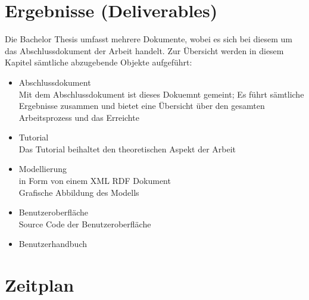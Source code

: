 \section{Ergebnisse (Deliverables)}
\label{sec:admin_ergebniss}
Die Bachelor Thesis umfasst mehrere Dokumente, wobei es sich bei diesem um das Abschlussdokument der Arbeit handelt. Zur Übersicht werden in diesem Kapitel sämtliche abzugebende Objekte aufgeführt:
\begin{itemize}
	\item Abschlussdokument\\ Mit dem Abschlussdokument ist dieses Dokuemnt gemeint; Es führt sämtliche Ergebnisse zusammen und bietet eine Übersicht über den gesamten Arbeitsprozess und das Erreichte
	\item Tutorial\\ Das Tutorial beihaltet den theoretischen Aspekt der Arbeit
	\item Modellierung \\in Form von einem XML RDF Dokument\\ Grafische Abbildung des Modells
	\item Benutzeroberfläche\\ Source Code der Benutzeroberfläche
	\item Benutzerhandbuch
\end{itemize}

\section{Zeitplan}
\label{sec:admin_zeitplan}


